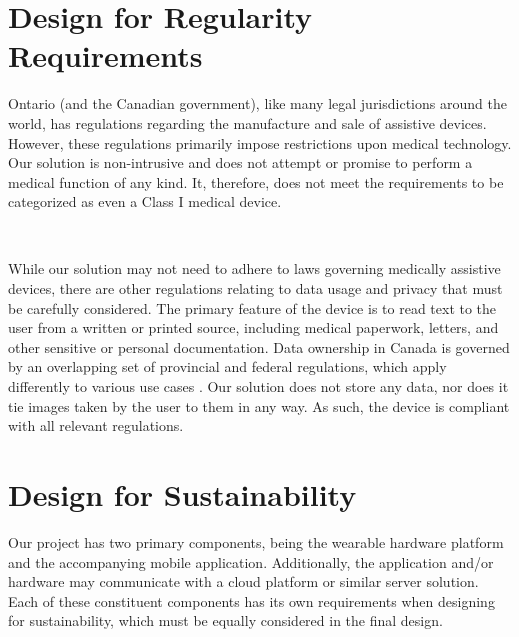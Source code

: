 \documentclass[a4paper,11pt]{article}
\begin{document}
\newpage
\section{Design for Regularity Requirements}
\noindent
Ontario (and the Canadian government), like many legal jurisdictions around the world, has regulations regarding the manufacture and sale of assistive devices. However, these regulations primarily impose restrictions upon medical technology. Our solution is non-intrusive and does not attempt or promise to perform a medical function of any kind. It, therefore, does not meet the requirements to be categorized as even a Class I medical device.

\

\noindent
While our solution may not need to adhere to laws governing medically assistive devices, there are other regulations relating to data usage and privacy that must be carefully considered. The primary feature of the device is to read text to the user from a written or printed source, including medical paperwork, letters, and other sensitive or personal documentation. Data ownership in Canada is governed by an overlapping set of provincial and federal regulations, which apply differently to various use cases \cite{pipeda}. Our solution does not store any data, nor does it tie images taken by the user to them in any way. As such, the device is compliant with all relevant regulations.


\newpage
\section{Design for Sustainability}
\noindent
Our project has two primary components, being the wearable hardware platform and the accompanying mobile application. Additionally, the application and/or hardware may communicate with a cloud platform or similar server solution. Each of these constituent components has its own requirements when designing for sustainability, which must be equally considered in the final design.

\
\end{document}
